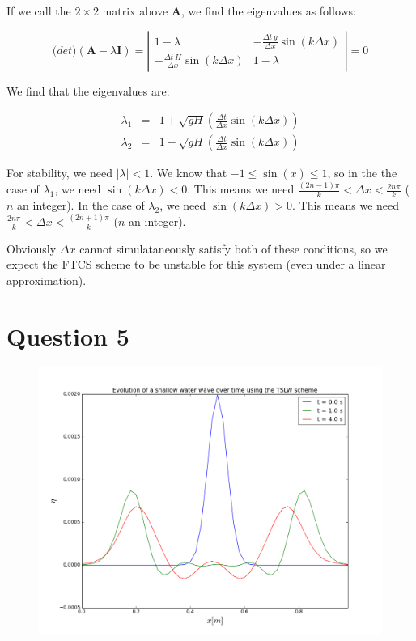 \documentclass[a4paper,12pt]{article}
\begin{document}
If we call the $2\times 2$ matrix above $\mathbf{A}$, we find the eigenvalues as follows:

\[\mathrm(det)(\mathbf{A}-\lambda \mathbf{I}) = 
\left|\begin{array}{cc}
1-\lambda & -\frac{\Delta t\,g}{\Delta x}\sin(k\Delta x)\\
-\frac{\Delta t\,H}{\Delta x}\sin(k\Delta x) & 1-\lambda
\end{array}\right| = 0\]

We find that the eigenvalues are:

\begin{eqnarray}
\lambda_1 &=& 1 + \sqrt{gH}\left(\frac{\Delta t}{\Delta x}\sin(k\Delta x)\right)\nonumber\\
\lambda_2 &=& 1 - \sqrt{gH}\left(\frac{\Delta t}{\Delta x}\sin(k\Delta x)\right)\nonumber
\end{eqnarray}

For stability, we need $|\lambda| < 1 $. We know that $-1 \leq \sin(x) \leq 1$, so in the the case of $\lambda_1$, we need $\sin(k\Delta x) < 0$. This means we need $\frac{(2n-1)\pi}{k} < \Delta x < \frac{2n\pi}{k}$ ($n$ an integer). In the case of $\lambda_2$, we need $\sin(k\Delta x) > 0$. This means we need $\frac{2n\pi}{k} < \Delta x < \frac{(2n+1)\pi}{k}$ ($n$ an integer). 

Obviously $\Delta x$ cannot simulataneously satisfy both of these conditions, so we expect the FTCS scheme to be unstable for this system (even under a linear approximation).

\section{Question 5}

\begin{figure}[H]
\centering
\includegraphics[width = \linewidth]{lab8q5.png}
\caption{}
\label{fig:q5}
\end{figure}
\end{document}
